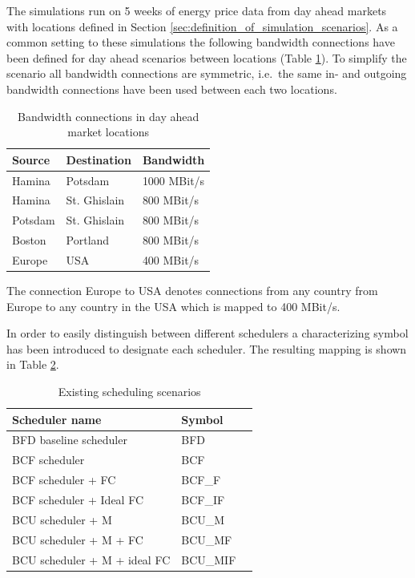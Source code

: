 The simulations run on 5 weeks of energy price data from day ahead markets with locations defined in Section \ref{sec:definition_of_simulation_scenarios}. As a common setting to these simulations the following bandwidth connections have been defined for day ahead scenarios between locations (Table \ref{tab:bandwidth_connections_in_da_markets}). To simplify the scenario all bandwidth connections are symmetric, i.e.~the same in- and outgoing bandwidth connections have been used between each two locations. 


\begin{table}[htbp]
\centering
\begin{tabular}{lll}
\toprule
	Source & Destination & Bandwidth \\
\midrule
	Hamina & Potsdam & 1000 MBit/s \\
	Hamina & St. Ghislain & 800 MBit/s \\
	Potsdam & St. Ghislain & 800 MBit/s \\
	Boston & Portland & 800 MBit/s \\
	Europe & USA & 400 MBit/s \\
\bottomrule
\end{tabular}
\caption{Bandwidth connections in day ahead market locations}
\label{tab:bandwidth_connections_in_da_markets}
\end{table}

The connection Europe to USA denotes connections from any country from Europe to any country in the USA which is mapped to 400 MBit/s. 

In order to easily distinguish between different schedulers a characterizing symbol has been introduced to designate each scheduler. The resulting mapping is shown in Table \ref{tab:scheduler_name_mapping}.

\begin{table}[htbp]
\centering
\begin{tabular}{lll}
\toprule
  Scheduler name & Symbol \\
\midrule
	BFD baseline scheduler & BFD \\
	BCF scheduler & BCF \\
	BCF scheduler + FC & BCF\_F \\
	BCF scheduler + Ideal FC & BCF\_IF \\
	BCU scheduler + M & BCU\_M \\
	BCU scheduler + M + FC & BCU\_MF \\
	BCU scheduler + M + ideal FC & BCU\_MIF \\
\bottomrule
\end{tabular}
\caption{Existing scheduling scenarios}
\label{tab:scheduler_name_mapping}
\end{table}


